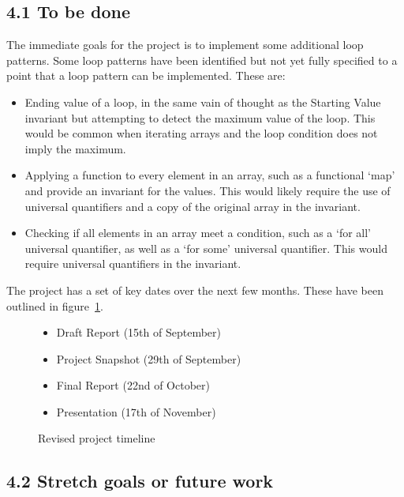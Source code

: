 \documentclass[11pt, a4paper, twoside, openright]{report}
\begin{document}
\subsection*{4.1 To be done}

The immediate goals for the project is to implement some additional loop
patterns. Some loop patterns have been identified but not yet
fully specified to a point that a loop pattern can be implemented.
These are:
\begin{itemize}
    \item Ending value of a loop, in the same vain of thought as the Starting
        Value invariant but attempting to detect the maximum value of the loop.
        This would be common when iterating arrays and the loop condition does
        not imply the maximum.
    \item Applying a function to every element in an array, such as a
        functional `map' and provide an invariant for the values.
        This would likely require the use of universal quantifiers
        and a copy of the original array in the invariant.
    \item Checking if all elements in an array meet a condition, such as
        a `for all' universal quantifier, as well as a `for some' universal
        quantifier.
        This would require universal quantifiers in the invariant.
\end{itemize}

The project has a set of key dates over the next few months.
These have been outlined in figure~\ref{list:timeline}.

\begin{figure}[ht]
    \begin{itemize}
        \item Draft Report (15th of September)
        \item Project Snapshot (29th of September)
        \item Final Report (22nd of October)
        \item Presentation (17th of November)
    \end{itemize}
    \caption{Revised project timeline}\label{list:timeline}
\end{figure}

\subsection*{4.2 Stretch goals or future work}
\end{document}
